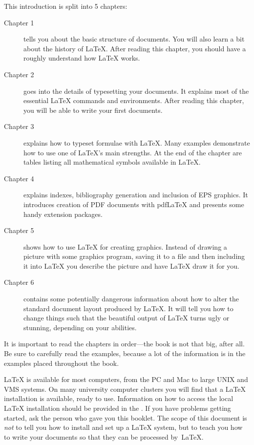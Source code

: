 \bigskip
\noindent This introduction is split into 5 chapters:
\begin{description}
\item[Chapter 1] tells you about the basic structure of \LaTeXe{}
  documents. You will also learn a bit about the history of \LaTeX{}.
  After reading this chapter, you should have a roughly understand how
  \LaTeX{} works.
\item[Chapter 2] goes into the details of typesetting your
  documents. It explains most of the essential \LaTeX{} commands and
  environments. After reading this chapter, you will be able to write
  your first documents. 
\item[Chapter 3] explains how to typeset formulae with \LaTeX. Many
  examples demonstrate how to use one of \LaTeX{}'s
  main strengths. At the end of the chapter are tables listing
  all mathematical symbols available in \LaTeX{}.
\item[Chapter 4] explains indexes,  bibliography generation and
  inclusion of EPS graphics. It introduces creation of PDF documents with pdf\LaTeX{}
  and presents some handy extension packages.
\item[Chapter 5] shows how to use \LaTeX{} for creating graphics. Instead
  of drawing a picture with some graphics program, saving it to a file and
  then including it into \LaTeX{} you describe the picture and have \LaTeX{}
  draw it for you.
\item[Chapter 6] contains some potentially dangerous information about
  how to alter the
  standard document layout produced by \LaTeX{}. It will tell you how  to
  change things such that the beautiful output of \LaTeX{}
  turns ugly or stunning, depending on your abilities.
\end{description}
\bigskip
\noindent It is important to read the chapters in order---the book is
not that big, after all. Be sure to carefully read the examples,
because a lot of the information is in the
examples placed throughout the book.

\bigskip
\noindent \LaTeX{} is available for most computers, from the PC and Mac to large
UNIX and VMS systems. On many university computer clusters you will
find that a \LaTeX{} installation is available, ready to use.
Information on how to access
the local \LaTeX{} installation should be provided in the \guide. If
you have problems getting started, ask the person who gave you this
booklet. The scope of this document is \emph{not} to tell you how to
install and set up a \LaTeX{} system, but to teach you how to write
your documents so that they can be processed by~\LaTeX{}.

